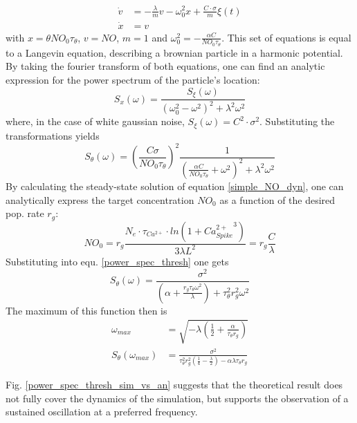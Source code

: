 \documentclass[10pt,a4paper]{article}
\begin{document}
\begin{align}
\dot{v} &= -\frac{\lambda}{m} v - \omega_0^2 x + \frac{C\cdot \sigma}{m} \xi (t) \label{langevin_v} \\
\dot{x} &= v \label{langevin_x}
\end{align}
with $x=\theta NO_0 \tau_{\theta}$, $v=NO$, $m=1$ and $\omega_0^2 =-\frac{\alpha C}{NO_0 \tau_{\theta}}$. This set of equations is equal to a Langevin equation, describing a brownian particle in a harmonic potential. By taking the fourier transform of both equations, one can find an analytic expression for the power spectrum of the particle's location:
\begin{equation}
S_x (\omega) = \frac{S_\xi (\omega)}{(\omega_0^2 - \omega^2)^2 + \lambda^2 \omega^2} \label{power_spec_part}
\end{equation}
where, in the case of white gaussian noise, $S_\xi(\omega)=C^2 \cdot \sigma^2$. Substituting the transformations yields
\begin{equation}
S_\theta (\omega) = \left( \frac{C \sigma}{NO_0 \tau_\theta}\right)^2 \frac{1}{(\frac{\alpha C}{NO_0 \tau_\theta} + \omega^2)^2 + \lambda^2 \omega^2} \label{power_spec_thresh}
\end{equation}
By calculating the steady-state solution of equation \eqref{simple_NO_dyn}, one can analytically express the target concentration $NO_0$ as a function of the desired pop. rate $r_g$:
\begin{equation}
NO_0=r_g \frac{N_e \cdot \tau_{Ca^{2+}} \cdot ln(1+{Ca_{Spike}^{2+}}^3)}{3\lambda L^2} = r_g \frac{C}{\lambda}
\label{NO_analytic}
\end{equation} 
Substituting into equ. \eqref{power_spec_thresh} one gets
\begin{equation}
S_\theta (\omega) = \frac{\sigma^2}{(\alpha+\frac{r_g \tau_\theta \omega^2}{\lambda})+\tau_\theta^2 r_g^2 \omega^2}
\label{power_spec_thresh_r_g}
\end{equation}
The maximum of this function then is
\begin{align}
\omega_{max} &= \sqrt{-\lambda(\frac{1}{2}+\frac{\alpha}{\tau_\theta r_g})} \label{max_omega}\\
S_\theta(\omega_{max}) &= \frac{\sigma^2}{\tau _\theta^2 r_g^2 \left(\frac{1}{4}-\frac{\lambda}{2}\right)-\alpha \lambda \tau _\theta r_g} \label{S_max_omega}
\end{align}

Fig. \ref{power_spec_thresh_sim_vs_an} suggests that the theoretical result does not fully cover the dynamics of the simulation, but supports the observation of a sustained oscillation at a preferred frequency.
\end{document}
